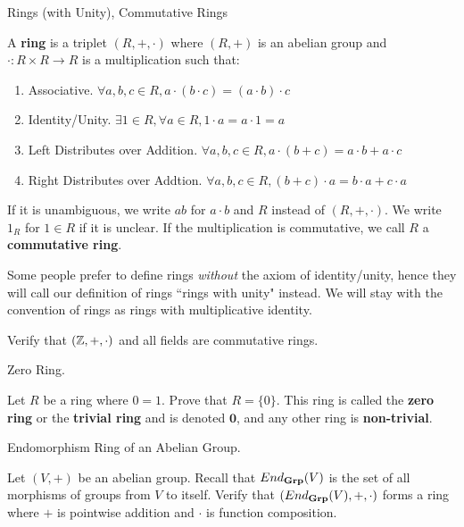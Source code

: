 \documentclass[../../book.tex]{subfiles}
\begin{document}
\begin{dfn} Rings (with Unity), Commutative Rings
    
    A \textbf{ring} is a triplet $(R,+,\cdot)$ where
    $(R,+)$ is an abelian group and 
    $\cdot : R \times R \to R$ is a multiplication such that:
    \begin{enumerate}
        \item Associative. 
        $\forall a, b, c \in R, a \cdot (b \cdot c) = (a \cdot b) \cdot c$
        \item Identity/Unity. 
        $\exists 1 \in R, \forall a \in R, 1 \cdot a = a \cdot 1 = a$
        \item Left Distributes over Addition. 
        $\forall a, b, c \in R, a\cdot(b + c) = a\cdot b + a\cdot c$
        \item Right Distributes over Addtion.
        $\forall a, b, c \in R, (b + c)\cdot a = b\cdot a + c\cdot a$
    \end{enumerate}
    If it is unambiguous, we write $ab$ for $a\cdot b$ and
    $R$ instead of $(R,+,\cdot)$. 
    We write $1_R$ for $1 \in R$ if it is unclear. 
    If the multiplication is commutative, we call $R$ a \textbf{commutative ring}.
    
    Some people prefer to define rings \emph{without} the axiom of identity/unity,
    hence they will call our definition of rings ``rings with unity" instead. 
    We will stay with the convention of rings as rings with multiplicative identity.
    
\end{dfn}

\begin{ex}
    Verify that $(\mathbb{Z},+,\cdot)$ and all fields are commutative rings. 
\end{ex}

\begin{ex} Zero Ring.
    
    Let $R$ be a ring where $0 = 1$. Prove that $R = \{0\}$.
    This ring is called the \textbf{zero ring} 
    or the \textbf{trivial ring} and is denoted $\textbf{0}$, 
    and any other ring is \textbf{non-trivial}.
\end{ex}

\begin{ex} Endomorphism Ring of an Abelian Group. 

    Let $(V,+)$ be an abelian group. 
    Recall that $End_{\mathbf{Grp}}(V)$ is 
    the set of all morphisms of groups from $V$ to itself.
    Verify that $(End_{\mathbf{Grp}}(V),+,\cdot)$ forms a ring where
    $+$ is pointwise addition and $\cdot$ is function composition. 
    
\end{ex}
\end{document}
